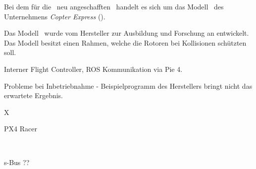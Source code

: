 
Bei dem für die \DHBW\ neu angeschafften \Quad\ handelt es sich um das Modell \Clover\ des Unternehmens \textit{Copter Express} (\COEX).

Das Modell \Clover\ wurde vom Hersteller zur Ausbildung und Forschung an \Quad[n] entwickelt. Das Modell besitzt einen Rahmen, welche die Rotoren bei Kollisionen schützten soll.




Interner Flight Controller, ROS Kommunikation via Pie 4.




Probleme bei Inbetriebnahme - Beispielprogramm des Herstellers bringt nicht das erwartete Ergebnis.









X






PX4 Racer


\Pie\



s-Bus ??



































